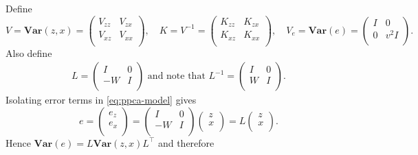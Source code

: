 Define \[
V   = \mathbf{Var}(z, x)= \left(
    \begin{array}{cccccccccccccccccccccccccccccccccccc}
      V_{zz} & V_{zx} \\ V_{xz} & V_{xx} \\
    \end{array}
  \right), \quad
K   = V^{-1}= \left(
    \begin{array}{cccccccccccccccccccccccccccccccccccc}
      K_{zz} & K_{zx} \\ K_{xz} & K_{xx} \\
    \end{array}
  \right), \quad
V_e = \mathbf{Var}(e)   = \left(
    \begin{array}{cccccccccccccccccccccccccccccccccccc}
      I & 0 \\ 0 & v^2 I \\
    \end{array}
  \right) .
\] Also define \begin{align} \label{eq:ppca-L}
L = \left(
    \begin{array}{cccccccccccccccccccccccccccccccccccc}
      I & 0 \\ -W & I \\
    \end{array}
  \right) \mbox{ and note that }
  L^{-1} = \left(
    \begin{array}{cccccccccccccccccccccccccccccccccccc}
      I & 0 \\ W & I \\
    \end{array}
  \right).
\end{align} Isolating error terms in \eqref{eq:ppca-model} gives \[
e 
= \left(
    \begin{array}{cccccccccccccccccccccccccccccccccccc}
      e_z \\ e_x \\
    \end{array}
  \right) 
= \left(
    \begin{array}{cccccccccccccccccccccccccccccccccccc}
      I & 0 \\ -W & I \\
    \end{array}
  \right) \left(
    \begin{array}{cccccccccccccccccccccccccccccccccccc}
      z \\ x \\
    \end{array}
  \right) 
= L \left(
    \begin{array}{cccccccccccccccccccccccccccccccccccc}
      z \\ x \\
    \end{array}
  \right) .
\] Hence \(\mathbf{Var}(e) = L \mathbf{Var}(z,x) L^\top\) and therefore

